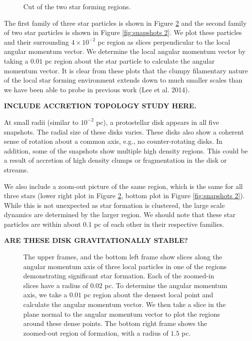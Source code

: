 \documentclass{emulateapj}
\begin{document}
\begin{figure}
\caption{Cut of the two star forming regions.\label{fig:star forming regions}}
\end{figure}

The first family of three star particles is shown in Figure \ref{fig:snapshots} and the second family of two star particles is shown in Figure \ref{fig:snapshots 2}.  We plot these particles and their surrounding $4\times 10^{-2}$ pc region as slices perpendicular to the local angular momentum vector.  We determine the local angular momentum vector by taking a $0.01$ pc region about the star particle to calculate the angular momentum vector.  It is clear from these plots that the clumpy filamentary nature of the local star forming environment extends down to much smaller scales than we have been able to probe in previous work (Lee et al. 2014).  

{\bf INCLUDE ACCRETION TOPOLOGY STUDY HERE.}

At small radii (similar to $10^{-2}$ pc), a protostellar disk appears in all five snapshots. The radial size of these disks varies. These disks also show a coherent sense of rotation about a common axis, e.g., no counter-rotating disks. In addition, some of the snapshots show multiple high density regions.  This could be a result of accretion of high density clumps or fragmentation in the disk or streams.  

We also include a zoom-out picture of the same region, which is the same for all three stars (lower right plot in Figure \ref{fig:snapshots}, bottom plot in Figure \ref{fig:snapshots 2}).  While this is not unexpected as star formation is clustered, the large scale dynamics are determined by the larger region.  We should note that these star particles are within about 0.1 pc of each other in their respective families.  

{\bf ARE THESE DISK GRAVITATIONALLY STABLE?}

\begin{figure}
\caption{The upper frames, and the bottom left frame show slices along the angular momentum axis of three local particles in one of the regions demonstrating significant star formation.  Each of the zoomed-in slices have a radius of $0.02$ pc.  To determine the angular momentum axis, we take a $0.01$ pc region about the densest local point and calculate the angular momentum vector.  We then take a slice in the plane normal to the angular momentum vector to plot the regions around these dense points.  The bottom right frame shows the zoomed-out region of formation, with a radius of $1.5$ pc.    \label{fig:snapshots}}
\end{figure}
\end{document}
